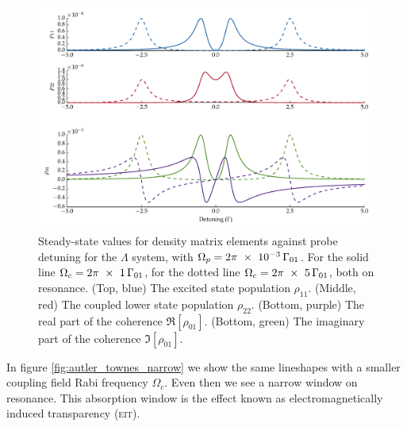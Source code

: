     \begin{figure}[h]
      \includegraphics[width=\linewidth]
        {figs/04_polaritons/plot_steady_scan_p000_1_c1_c5_fig1.pdf}
      \caption{
      Steady-state values for density matrix elements against probe detuning for
      the $\Lambda$ system, with $\Omega_p =
      \unit[2\pi~\times~10^{-3}]{\Gamma_{01}}$. For the solid line $\Omega_c =
      \unit[2\pi~\times~1]{\Gamma_{01}}$, for the dotted line $\Omega_c =
      \unit[2\pi~\times~5]{\Gamma_{01}}$, both on resonance. (Top, blue) The
      excited state population $\rho_{11}$. (Middle, red) The coupled lower
      state population $\rho_{22}$. (Bottom, purple) The real part of the
      coherence  $\Re \left[ \rho_{01} \right]$. (Bottom, green) The imaginary
      part of the coherence  $\Im \left[ \rho_{01} \right]$.
      }
      \label{fig:autler_townes}
    \end{figure}

    In figure \ref{fig:autler_townes_narrow} we show the same lineshapes with a
    smaller coupling field Rabi frequency $\Omega_c$. Even then we see a narrow
    window on resonance. This absorption window is the effect known as
    electromagnetically induced transparency (\textsc{eit}).

